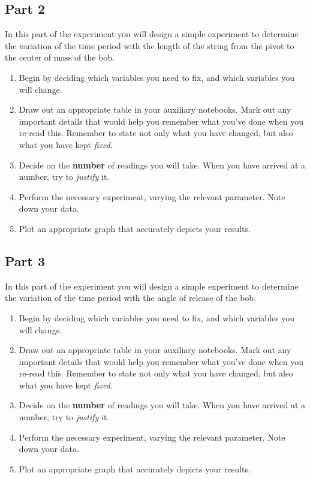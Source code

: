 \subsection{Part 2}

In this part of the experiment you will design a simple experiment to determine the variation of the time period with the length of the string from the pivot to the center of mass of the bob.

\begin{enumerate}
    \item Begin by deciding which variables you need to fix, and which variables you will change.
    
    \item Draw out an appropriate table in your auxiliary notebooks. Mark out any important details that would help you remember what you've done when you re-read this. Remember to state not only what you have changed, but also what you have kept \textit{fixed}.
    
    \item Decide on the \textbf{number} of readings you will take. When you have arrived at a number, try to \textit{justify} it.
    
    \item Perform the necessary experiment, varying the relevant parameter. Note down your data.
    
    \item Plot an appropriate graph that accurately depicts your results.
\end{enumerate}

\subsection{Part 3}

In this part of the experiment you will design a simple experiment to determine the variation of the time period with the angle of release of the bob.

\begin{enumerate}
    \item Begin by deciding which variables you need to fix, and which variables you will change.
    
    \item Draw out an appropriate table in your auxiliary notebooks. Mark out any important details that would help you remember what you've done when you re-read this. Remember to state not only what you have changed, but also what you have kept \textit{fixed}.
    
    \item Decide on the \textbf{number} of readings you will take. When you have arrived at a number, try to \textit{justify} it.
    
    \item Perform the necessary experiment, varying the relevant parameter. Note down your data.
    
    \item Plot an appropriate graph that accurately depicts your results.
\end{enumerate}


